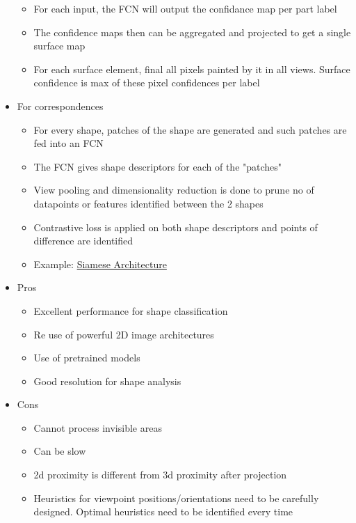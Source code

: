 \documentclass{article}
\theoremstyle{definition}
\theoremstyle{remark}
\begin{document}
\begin{itemize}
\begin{itemize}
        \item For each input, the FCN will output the confidance map per part label
        \item The confidence maps then can be aggregated and projected to get a single surface map
        \item For each surface element, final all pixels painted by it in all views. Surface confidence is max of these pixel confidences per label
    \end{itemize}
    \item For correspondences
    \begin{itemize}
        \item For every shape, patches of the shape are generated and such patches are fed into an FCN
        \item The FCN gives shape descriptors for each of the "patches"
        \item View pooling and dimensionality reduction is done to prune no of datapoints or features identified between the 2 shapes
        \item Contrastive loss is applied on both shape descriptors and points of difference are identified
        \item Example: \href{https://www.cs.cmu.edu/~rsalakhu/papers/oneshot1.pdf}{Siamese Architecture}
    \end{itemize}
    \item Pros
    \begin{itemize}
        \item Excellent performance for shape classification
        \item Re use of powerful 2D image architectures
        \item Use of pretrained models
        \item Good resolution for shape analysis
    \end{itemize}
    \item Cons
        \begin{itemize}
            \item Cannot process invisible areas 
            \item Can be slow 
            \item 2d proximity is different from 3d proximity after projection
            \item Heuristics for viewpoint positions/orientations need to be carefully designed. Optimal heuristics need to be identified every time
        \end{itemize}
\end{itemize}
\end{document}
